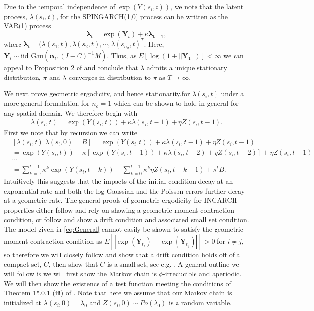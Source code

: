 \documentclass[11pt]{isuthesis}
\begin{document}
Due to the temporal independence of $\exp(Y(s_i,t))$, we note that the latent process, $\lambda(s_i,t)$, for the SPINGARCH(1,0) process can be written as the VAR(1) process
\begin{equation}
	\boldsymbol{\lambda}_t=\exp(\boldsymbol{Y}_t)+\kappa\boldsymbol{\lambda_{t-1}},
\end{equation}
where $\boldsymbol{\lambda}_{t} = (\lambda(s_1,t),\lambda(s_2,t),\cdots,\lambda(s_{n_d},t)^T$.  Here, $\boldsymbol{Y}_t \sim \mbox{iid Gau}\left(\boldsymbol{\alpha}_t,(I-C)^{-1}M\right)$.  Thus, as $E[\log \left(1+||\boldsymbol{Y}_1||\right)]<\infty$ we can appeal to Proposition 2 of \cite{zeevi2004recurrence} and conclude that $\lambda$ admits a unique stationary distribution, $\pi$ and $\lambda$ converges in distribution to $\pi$ as $T\to \infty$.

We next prove geometric ergodicity, and hence stationarity,for $\lambda(s_i,t)$ under a more general formulation for $n_d=1$ which can be shown to hold in general for any spatial domain.  We therefore begin with
\begin{align}
	\lambda(s_i,t)= \exp(Y(s_i,t))+\kappa \lambda(s_i,t-1) + \eta Z(s_i,t-1) \label{eq:General}.
\end{align}
First we note that by recursion we can write
\begin{align*}
	& [\lambda(s_i,t)|\lambda(s_i,0)=B] = \exp(Y(s_i,t))+\kappa \lambda(s_i,t-1) + \eta Z(s_i,t-1)\\
	& = \exp(Y(s_i,t))+\kappa \left[\exp(Y(s_i,t-1))+\kappa \lambda(s_i,t-2) + \eta Z(s_i,t-2)\right] + \eta Z(s_i,t-1)\\
	&\cdots\\
	& =\sum_{k=0}^{t-1} \kappa^k\exp(Y(s_i,t-k)) +\sum_{k=0}^{t-1} \kappa^k\eta Z(s_i,t-k-1)+\kappa^t B. \label{eq:Recursion}
\end{align*}
Intuitively this suggests that the impacts of the initial condition decay at an exponential rate and both the log-Gaussian and the Poisson errors further decay at a geometric rate.  The general proofs of geometric ergodicity for INGARCH properties either follow \cite{davis2016theory} and rely on showing a geometric moment contraction condition, or follow \cite{fokianos2009poisson} and show a drift condition and associated small set condition.  The model given in \eqref{eq:General} cannot easily be shown to satisfy the geometric moment contraction condition as $E[|\exp(\boldsymbol{Y}_{t_i})-\exp(\boldsymbol{Y}_{t_j})|]>0$ for $i \neq j$, so therefore we will closely follow \cite{fokianos2009poisson} and show that a drift condition holds off of a compact set, $C$, then show that $C$ is a small set, see e.g. \cite{meyn2012markov}.  A general outline we will follow is we will first show the Markov chain is $\phi$-irreducible and aperiodic.  We will then show the existence of a test function meeting the conditions of Theorem 15.0.1 (iii) of \cite{meyn2012markov}.  Note that here we assume that our Markov chain is initialized at $\lambda(s_i,0)=\lambda_0$ and $Z(s_i,0)\sim Po(\lambda_0)$ is a random variable.
\end{document}
